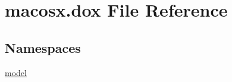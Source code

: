 \hypertarget{macosx_8dox}{}\section{macosx.\+dox File Reference}
\label{macosx_8dox}
\subsection*{Namespaces}
\begin{DoxyCompactItemize}
\item 
 \hyperlink{namespacemodel}{model}
\end{DoxyCompactItemize}
